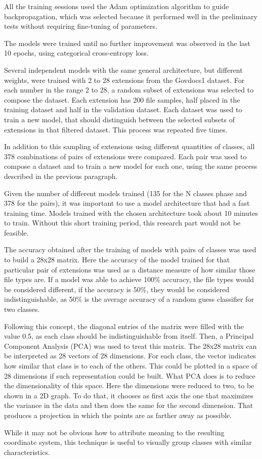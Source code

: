 All the training sessions used the Adam \cite{kingma_adam:_2014}
optimization algorithm to guide backpropagation, which was selected because it performed well in the preliminary tests without requiring fine-tuning of parameters.

The models were trained until no further improvement was observed in the last 10 epochs, using categorical cross-entropy loss.

Several independent models with the same general architecture, but different weights, were trained with 2 to 28 extensions from the Govdocs1 dataset. For each number in the range 2 to 28, a random subset of extensions was selected to compose the dataset. Each extension has 200 file samples, half placed in the training dataset and half in the validation dataset. Each dataset was used to train a new model, that should distinguish between the selected subsets of extensions in that filtered dataset. This process was repeated five times.

In addition to this sampling of extensions using different quantities of classes, all 378 combinations of pairs of extensions were compared. Each pair was used to compose a dataset and to train a new model for each one, using the same process described in the previous paragraph.

Given the number of different models trained (135 for the N classes phase and 378 for the pairs), it was important to use a model architecture that had a fast training time. Models trained with the chosen architecture took about 10 minutes to train. Without this short training period, this research part would not be feasible.

The accuracy obtained after the training of models with pairs of classes was used to build a 28x28 matrix. Here the accuracy of the model trained for that particular pair of extensions was used as a distance measure of how similar those file types are. If a model was able to achieve 100\% accuracy, the file types would be considered different, if the accuracy is 50\%, they would be considered indistinguishable, as 50\% is the average accuracy of a random guess classifier for two classes.

Following this concept, the diagonal entries of the matrix were filled with the value 0.5, as each class should be indistinguishable from itself. Then, a Principal Component Analysis (PCA) \cite{amirani_new_2008} was used to treat this matrix. The 28x28 matrix can be interpreted as 28 vectors of 28 dimensions. For each class, the vector indicates how similar that class is to each of the others. This could be plotted in a space of 28 dimensions if such representation could be built. What PCA does is to reduce the dimensionality of this space. Here the dimensions were reduced to two, to be shown in a 2D graph. To do that, it chooses as first axis the one that maximizes the variance in the data and then does the same for the second dimension. That produces a projection in which the points are as farther away as possible.

While it may not be obvious how to attribute meaning to the resulting coordinate system, this technique is useful to visually group classes with similar characteristics.

